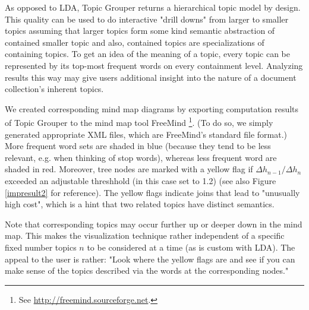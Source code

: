 \documentclass[10pt, a4paper, oneside]{article}
\begin{document}
As opposed to LDA, Topic Grouper returns a hierarchical topic model by design.
This quality can be used to do interactive "drill downs" from larger to smaller topics assuming that larger topics form some kind semantic abstraction of contained smaller topic and also, contained topics are specializations of containing topics. To get an idea of the meaning of a topic, every topic can be represented by its top-most frequent words on every containment level.
Analyzing results this way may give users additional insight into the nature of a document collection's inherent topics.

We created corresponding mind map diagrams by exporting computation results of Topic Grouper to the mind map tool FreeMind
\footnote{See \href{http://freemind.sourceforge.net}{http://freemind.sourceforge.net}.}. (To do so, we simply generated appropriate XML files, which are FreeMind's standard file format.) More frequent word sets are shaded in blue (because they tend to be less relevant, e.g. when thinking of stop words), whereas less frequent word are shaded in red. Moreover, tree nodes are marked with a yellow flag if 
$\Delta h_{n-1} / \Delta h_{n}$ exceeded an adjustable threshhold (in this case set to 1.2) (see also Figure \ref{impresult2} for reference).
The yellow flags indicate joins that lead to "unusually high cost", which is a hint that two related topics have distinct semantics.

Note that corresponding topics may occur further up or deeper down in the mind map. This makes the visualization technique rather independent of a specific fixed number topics $n$ to be considered at a time (as is custom with LDA). The appeal to the user is rather: "Look where the yellow flags are and see if you can make sense of the topics described via the words at the corresponding nodes."
\end{document}
